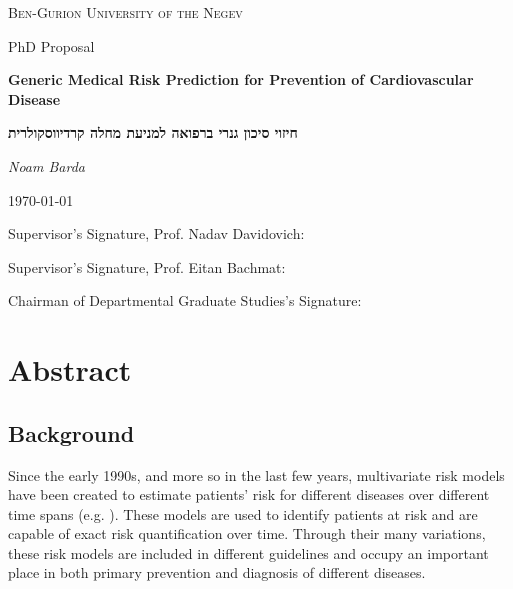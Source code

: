 \documentclass[a4paper,12pt]{article}
\begin{document}
	\begin{titlepage}
		\centering
		{\scshape\LARGE Ben-Gurion University of the Negev\par}
		\vspace{1cm}
		{\Large PhD Proposal\par}
		\vspace{2cm}
		{\huge\bfseries Generic Medical Risk Prediction for Prevention of Cardiovascular Disease\par}
		\vspace{1cm}
		\begin{hebrew}
		{\huge\bfseries חיזוי סיכון גנרי ברפואה למניעת מחלה קרדיווסקולרית\par}
		\end{hebrew}
		\vspace{1.5cm}
		{\Large\itshape Noam Barda\par}
		{\large \today\par}
		\vfill
		Supervisor's Signature, Prof. Nadav Davidovich: \underline{\hspace{5cm}}\par
		\vspace{0.5cm}
		Supervisor's Signature, Prof. Eitan Bachmat: \underline{\hspace{5cm}}\par
		\vspace{0.5cm}
		Chairman of Departmental Graduate Studies's Signature: \underline{\hspace{5cm}}\par
		
	\end{titlepage}
	
	
	\tableofcontents
	\newpage
	
	\section{Abstract}
	
		\subsection{Background}
		Since the early 1990s, and more so in the last few years,  multivariate risk models have been created to estimate patients' risk for different diseases over different time spans (e.g. \cite{Wilson1998,Conroy2003,DAgostino2008}). These models are used to identify patients at risk and are capable of exact risk quantification over time\cite{Goff2014}. Through their many variations, these risk models are included in different guidelines and occupy an important place in both primary prevention and diagnosis of different diseases\cite{Graham2007,Goff2014}.
	
\end{document}
